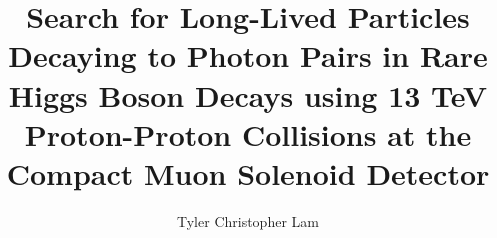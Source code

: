 \documentclass[PhD]{uclathes}
\title{
	Search for Long-Lived Particles Decaying to Photon Pairs in Rare Higgs Boson Decays using 13 TeV Proton-Proton Collisions at the Compact Muon Solenoid Detector
}
\author{Tyler Christopher Lam}
\begin{document}
\makeintropages






\begin{appendices}
	
\end{appendices}


\end{document}
